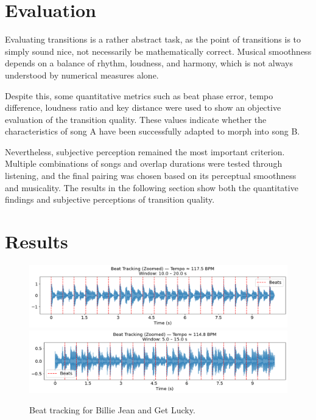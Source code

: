 \documentclass[14pt]{extarticle}
\begin{document}
\section{Evaluation}

Evaluating transitions is a rather abstract task, as the point of transitions is to simply sound nice, not necessarily be mathematically correct. Musical smoothness depends on a balance of rhythm, loudness, and harmony, which is not always understood by numerical measures alone.

Despite this, some quantitative metrics such as beat phase error, tempo difference, loudness ratio and key distance were used to show an objective evaluation of the transition quality. These values indicate whether the characteristics of song A have been successfully adapted to morph into song B.

Nevertheless, subjective perception remained the most important criterion. Multiple combinations of songs and overlap durations were tested through listening, and the final pairing was chosen based on its perceptual smoothness and musicality. The results in the following section show both the quantitative findings and subjective perceptions of transition quality.




\section{Results}

\begin{figure}[H]
    \centering
    \includegraphics[width=\textwidth]{figures/beat_tracking_bj.png}
    \includegraphics[width=\textwidth]{figures/beat_tracking_gl.png}
    \caption{Beat tracking for Billie Jean and Get Lucky.}
\end{figure}
\end{document}
